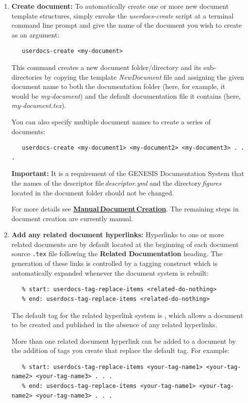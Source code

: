 \documentclass[12pt]{article}
\begin{document}
\begin{enumerate}

\item {\bf Create document:}  To automatically create one or more new document template structures, simply envoke the {\it userdocs-create} script at a terminal command line prompt and give the name of the document you wish to create as an argument:
\begin{verbatim}
   userdocs-create <my-document>
\end{verbatim}
This command creates a new document folder/directory and its sub-directories by copying the template {\it NewDocument} file and assigning the given document name to both the documentation folder (here, for example, it would be {\it my-document}) and the default documentation file it contains (here, {\it my-document.tex}).

You can also specify multiple document names to create a series of documents:
\begin{verbatim}
   userdocs-create <my-document1> <my-document2> <my-document3> . . .
\end{verbatim}
{\bf Important:} It is a requirement of the GENESIS Documentation System that the names of the descriptor file\,{\it descriptor.yml} and the directory\,{\it figures} located in the document folder should not be changed.

For more details see \href{../document-create-manual/document-create-manual.tex}{\bf Manual\,Document\,Creation}. The remaining steps in document creation are currently manual.

\item {\bf Add any related document hyperlinks:} Hyperlinks to one or more related documents are by default located at the beginning of each document source {\tt .tex} file following the {\bf Related Documentation} heading. The generation of these links is controlled by a tagging construct which is automatically expanded whenever the document system is rebuilt:
\begin{verbatim}
   % start: userdocs-tag-replace-items <related-do-nothing>
   % end: userdocs-tag-replace-items <related-do-nothing>
\end{verbatim}
The default tag for the related hyperlink system is {\tt <related-do-nothing>}, which allows a document to be created and published in the absence of any related hyperlinks. 

More than one related document hyperlink can be added to a document by the addition of tags you create that replace the default tag. For example:
\begin{verbatim}
   % start: userdocs-tag-replace-items <your-tag-name1> <your-tag-name2> <your-tag-name3> . . .
   % end: userdocs-tag-replace-items <your-tag-name1> <your-tag-name2> <your-tag-name3> . . .
\end{verbatim}


\end{enumerate}
\end{document}
